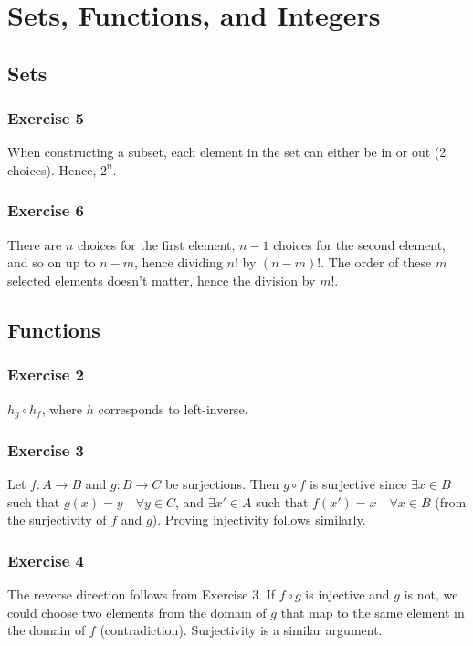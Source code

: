 \section{Sets, Functions, and Integers}
\subsection{Sets}

\subsubsection{Exercise 5}
When constructing a subset, each element in the set can either be in or out (2 choices).
Hence, $2^n$.

\subsubsection{Exercise 6}
There are $n$ choices for the first element, $n-1$ choices for the second element,
and so on up to $n-m$, hence dividing $n!$ by $(n-m)!$. The order of these $m$ selected
elements doesn't matter, hence the division by $m!$.

\subsection{Functions}

\subsubsection{Exercise 2}
$h_g \circ h_f$, where $h$ corresponds to left-inverse.

\subsubsection{Exercise 3}
Let $f:A \to B$ and $g:B \to C$ be surjections. Then  $g \circ f$ is surjective
since $\exists x \in B$ such that $g(x) = y \quad \forall y \in C$, and 
$\exists x' \in A$ such that $f(x') = x \quad \forall x \in B$
(from the surjectivity of $f$ and $g$). Proving injectivity follows similarly.

\subsubsection{Exercise 4}
The reverse direction follows from Exercise 3. If $f \circ g$ is injective and $g$ is not,
we could choose two elements from the domain of $g$ that map to the same element in 
the domain of $f$ (contradiction). Surjectivity is a similar argument.

